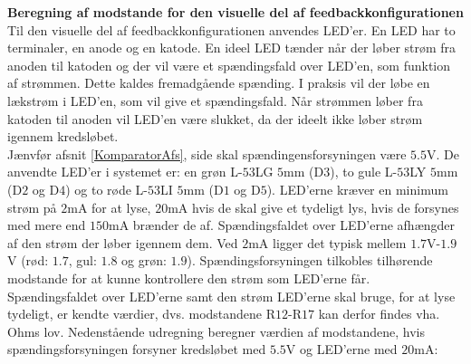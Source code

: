 \noindent\textbf{Beregning af modstande for den visuelle del af feedbackkonfigurationen} \\
Til den visuelle del af feedbackkonfigurationen anvendes LED'er. En LED har to terminaler, en anode og en katode. En ideel LED tænder når der løber strøm fra anoden til katoden og der vil være et spændingsfald over LED'en, som funktion af strømmen. Dette kaldes fremadgående spænding. I praksis vil der løbe en lækstrøm i LED'en, som vil give et spændingsfald. Når strømmen løber fra katoden til anoden vil LED'en være slukket, da der ideelt ikke løber strøm igennem kredsløbet. \cite{Sedra2010} \\
Jænvfør afsnit \ref{KomparatorAfs}, side \pageref{KomparatorAfs} skal spændingensforsyningen være $5.5$V. De anvendte LED'er i systemet er: en grøn L-$53$LG $5$mm (D$3$), to gule L-$53$LY $5$mm (D$2$ og D$4$) og to røde L-$53$LI $5$mm (D$1$ og D$5$). LED'erne kræver en minimum strøm på $2$mA for at lyse, $20$mA hvis de skal give et tydeligt lys, hvis de forsynes med mere end $150$mA brænder de af.  Spændingsfaldet over LED'erne afhængder af den strøm der løber igennem dem. Ved $2$mA ligger det typisk mellem $1.7$V-$1.9$V (rød: $1.7$, gul: $1.8$ og grøn: $1.9$). 
Spændingsforsyningen tilkobles tilhørende modstande for at kunne kontrollere den strøm som LED'erne får. \cite{kingbright} Spændingsfaldet over LED'erne samt den strøm LED'erne skal bruge, for at lyse tydeligt, er kendte værdier, dvs. modstandene R$12$-R$17$ kan derfor findes vha. Ohms lov. Nedenstående udregning beregner værdien af modstandene, hvis spændingsforsyningen forsyner kredsløbet med $5.5$V og LED'erne med $20$mA:


